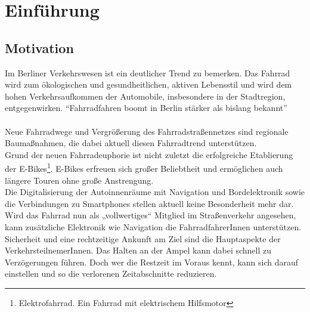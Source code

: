 \chapter{\label{chap:einleitung}Einführung}
\section{Motivation}
Im Berliner Verkehrswesen ist ein deutlicher Trend zu bemerken. Das Fahrrad wird zum ökologischen und gesundheitlichen, aktiven Lebensstil und wird dem hohen Verkehrsaufkommen der Automobile, insbesondere in der Stadtregion, entgegenwirken. “Fahrradfahren boomt in Berlin stärker als bislang bekannt”\cite{Mopo}\\\\
Neue Fahrradwege und Vergrößerung des Fahrradstraßennetzes sind regionale Baumaßnahmen, die dabei aktuell diesen Fahrradtrend unterstützen. \cite{Mopo} \\
Grund der neuen Fahrradeuphorie ist nicht zuletzt die erfolgreiche Etablierung der E-Bikes\footnote{ Elektrofahrrad. Ein Fahrrad mit elektrischem Hilfsmotor}. E-Bikes erfreuen sich großer Beliebtheit und ermöglichen auch längere Touren ohne große Anstrengung.\cite{ebikes}\\ 
Die Digitalisierung der Autoinnenräume mit Navigation und Bordelektronik sowie die Verbindungen zu \glspl{Smartphone} stellen aktuell keine Besonderheit mehr dar. Wird das Fahrrad nun als „vollwertiges“ Mitglied im Straßenverkehr angesehen, kann zusätzliche Elektronik wie Navigation die FahrradfahrerInnen unterstützen.\\
Sicherheit und eine rechtzeitige Ankunft am Ziel sind die Hauptaspekte der VerkehrsteilnemerInnen. Das Halten an der Ampel kann dabei schnell zu Verzögerungen führen. Doch wer die Restzeit im Voraus kennt, kann sich darauf einstellen und so die verlorenen Zeitabschnitte reduzieren.
